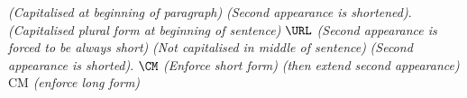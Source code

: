 \documentclass{article}
\begin{document}
\PDF \emph{(Capitalised at beginning of paragraph)}
\PDF \emph{(Second appearance is shortened)}.
\URLs \emph{(Capitalised plural form at beginning of sentence)}
$\URL$ \emph{(Second appearance is forced to be always short)}
\LM \emph{(Not capitalised in middle of sentence)}
\LM \emph{(Second appearance is shorted)}.
$\CM$ \emph{(Enforce short form)}
\CM \emph{(then extend second appearance)}
\glsdesc*{CM} \emph{(enforce long form)}
\end{document}
